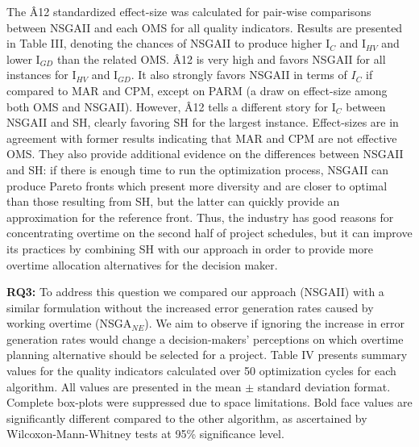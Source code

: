 \documentclass[conference]{IEEEtran}
\begin{document}
The {\^A12} standardized effect-size was calculated for pair-wise comparisons between NSGAII and each OMS for all quality indicators. Results are presented in Table III, denoting the chances of NSGAII to produce higher I$_C$ and I$_{HV}$ and lower I$_{GD}$ than the related OMS. {\^A}12 is very high and favors NSGAII for all instances for I$_{HV}$ and I$_{GD}$. It also strongly favors NSGAII in terms of $I_C$ if compared to MAR and CPM, except on PARM (a draw on effect-size among both OMS and NSGAII). However, {\^A}12 tells a different story for I$_{C}$ between NSGAII and SH, clearly favoring SH for the largest instance. Effect-sizes are in agreement with former results indicating that MAR and CPM are not effective OMS. They also provide additional evidence on the differences between NSGAII and SH: if there is enough time to run the optimization process, NSGAII can produce Pareto fronts which present more diversity and are closer to optimal than those resulting from SH, but the latter can quickly provide an approximation for the reference front. Thus, the industry has good reasons for concentrating overtime on the second half of project schedules, but it can improve its practices by combining SH with our approach in order to provide more overtime allocation alternatives for the decision maker.

\vspace{3px}
\noindent
\textbf{RQ3:} To address this question we compared our approach (NSGAII) with a similar formulation without the increased error generation rates caused by working overtime (NSGA$_{NE}$). We aim to observe if ignoring the increase in error generation rates would change a decision-makers' perceptions on which overtime planning alternative should be selected for a project. Table IV presents summary values for the quality indicators calculated over 50 optimization cycles for each algorithm. All values are presented in the mean $\pm$ standard deviation format. Complete box-plots were suppressed due to space limitations. Bold face values are significantly different compared to the other algorithm, as ascertained by Wilcoxon-Mann-Whitney tests at 95\% significance level. 
\end{document}
